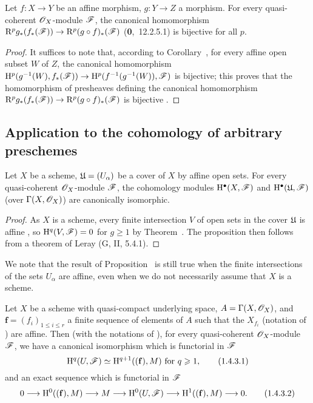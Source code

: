 \begin{cor}[1.3.4]
\label{3.1.3.4}
Let $f:X\to Y$ be an affine morphism, $g:Y\to Z$ a morphism.
For every quasi-coherent $\mathscr{O}_X$-module $\mathscr{F}$, the canonical homomorphism $\RR^p g_*(f_*(\sh{F}))\to\RR^p(g\circ f)_*(\sh{F})$ (\textbf{0},~12.2.5.1) is bijective for all $p$.
\end{cor}

\begin{proof}
\label{proof-3.1.3.4}
It suffices to note that, according to Corollary~, for every affine open subset $W$ of $Z$, the canonical homomorphism $\HH^p(g^{-1}(W),f_*(\sh{F}))\to\HH^p(f^{-1}(g^{-1}(W)),\sh{F})$ is bijective; this proves that the homomorphism of presheaves defining the canonical homomorphism $\RR^p g_*(f_*(\sh{F}))\to\RR^p(g\circ f)_*(\sh{F})$ is bijective .
\end{proof}

\subsection{Application to the cohomology of arbitrary preschemes}
\label{subsection:3.1.4}

\begin{prop}[1.4.1]
\label{3.1.4.1}
Let $X$ be a scheme, $\mathfrak{U}=(U_\alpha)$ be a cover of $X$ by affine open sets.
For every quasi-coherent $\mathscr{O}_X$-module $\mathscr{F}$, the cohomology modules $\mathrm{H}^\bullet(X,\mathscr{F})$ and $\mathrm{H}^\bullet(\mathfrak{U},\mathscr{F})$ (over $\Gamma(X,\mathscr{O}_X)$) are canonically isomorphic.
\end{prop}

\begin{proof}
\label{proof-3.1.4.1}
As $X$ is a scheme, every finite intersection $V$ of open sets in the cover $\mathfrak{U}$ is affine , so $\mathrm{H}^q(V,\mathscr{F})=0$ for $g\geq 1$ by Theorem~.
The proposition then follows from a theorem of Leray (G, II, 5.4.1).
\end{proof}

\begin{rmk}[1.4.2]
\label{3.1.4.2}
We note that the result of Proposition~ is still true when the finite intersections of the sets $U_\alpha$ are affine, even when we do not necessarily assume that $X$ is a scheme.
\end{rmk}

\begin{cor}[1.4.3]
\label{3.1.4.3}
Let $X$ be a scheme with quasi-compact underlying space, $A=\Gamma(X,\mathscr{O}_X)$, and $\mathbf{f}=(f_i)_{1\leq i\leq r}$ a finite sequence of elements of $A$ such that the $X_{f_i}$ (notation of ) are affine.
Then (with the notations of ), for every quasi-coherent $\mathscr{O}_X$-module $\mathscr{F}$, we have a canonical isomorphism which is functorial in $\mathscr{F}$
\[
  \mathrm{H}^q(U,\mathscr{F})\simeq\mathrm{H}^{q+1}((\mathbf{f}),M)\text{ for }q\geqslant 1,
  \tag{1.4.3.1}
\]
and an exact sequence which is functorial in $\mathscr{F}$
\[
  0\to\HH^0((\mathbf{f}),M)\to M\to\HH^0(U,\sh{F})\to\HH^1((\mathbf{f}),M)\to 0.
  \tag{1.4.3.2}
\]
\end{cor}

